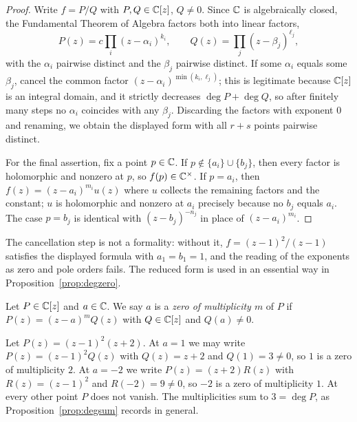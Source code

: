 \begin{proof}
Write $f = P/Q$ with $P, Q \in \mathbb{C}[z]$, $Q \neq 0$. Since $\mathbb{C}$ is algebraically
closed, the Fundamental Theorem of Algebra factors both into linear factors,
\[
P(z) = c \prod_{i} (z - \alpha_i)^{k_i}, \qquad
Q(z) = \prod_{j} (z - \beta_j)^{\ell_j},
\]
with the $\alpha_i$ pairwise distinct and the $\beta_j$ pairwise distinct.
If some $\alpha_i$ equals some $\beta_j$, cancel the common factor
$(z-\alpha_i)^{\min(k_i,\ell_j)}$; this is legitimate because $\mathbb{C}[z]$ is an
integral domain, and it strictly decreases $\deg P + \deg Q$, so after finitely
many steps no $\alpha_i$ coincides with any $\beta_j$. Discarding the factors
with exponent $0$ and renaming, we obtain the displayed form with all $r+s$
points pairwise distinct.

For the final assertion, fix a point $p \in \mathbb{C}$. If $p \notin \{a_i\} \cup
\{b_j\}$, then every factor is holomorphic and nonzero at $p$, so $f(p) \in
\mathbb{C}^\times$. If $p = a_i$, then $f(z) = (z-a_i)^{m_i} u(z)$ where $u$ collects
the remaining factors and the constant; $u$ is holomorphic and nonzero at $a_i$
precisely because no $b_j$ equals $a_i$. The case $p = b_j$ is identical with
$(z-b_j)^{-n_j}$ in place of $(z-a_i)^{m_i}$.
\end{proof}

\begin{remark}
The cancellation step is not a formality: without it, $f = (z-1)^2/(z-1)$
satisfies the displayed formula with $a_1 = b_1 = 1$, and the reading of the
exponents as zero and pole orders fails. The reduced form is used in an essential
way in Proposition~\ref{prop:degzero}.
\end{remark}

\begin{definition}\label{def:mult}
Let $P \in \mathbb{C}[z]$ and $a \in \mathbb{C}$. We say $a$ is a \emph{zero of multiplicity
$m$} of $P$ if $P(z) = (z-a)^m Q(z)$ with $Q \in \mathbb{C}[z]$ and $Q(a) \neq 0$.
\end{definition}

\begin{example}\label{ex:mult}
Let $P(z) = (z-1)^2(z+2)$. At $a = 1$ we may write $P(z) = (z-1)^2 Q(z)$ with
$Q(z) = z+2$ and $Q(1) = 3 \neq 0$, so $1$ is a zero of multiplicity $2$.
At $a = -2$ we write $P(z) = (z+2) R(z)$ with $R(z) = (z-1)^2$ and $R(-2) = 9
\neq 0$, so $-2$ is a zero of multiplicity $1$. At every other point $P$ does not
vanish. The multiplicities sum to $3 = \deg P$, as
Proposition~\ref{prop:degsum} records in general.
\end{example}

